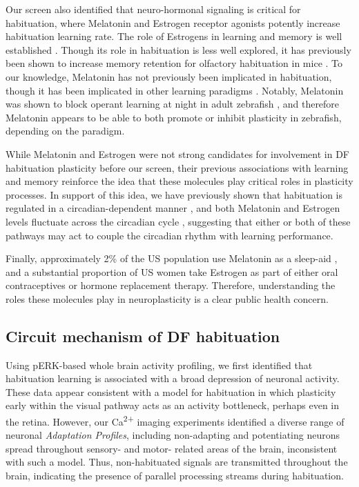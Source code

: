 \documentclass[9pt,lineno]{RandlettLab_elife}
\begin{document}
Our screen also identified that neuro-hormonal signaling is critical for habituation, where Melatonin and Estrogen receptor agonists potently increase habituation learning rate. The role of Estrogens in learning and memory is well established \cite{Luine1998-iz,Nilsson2002-fi}. Though its role in habituation is less well explored, it has previously been shown to increase memory retention for olfactory habituation in mice \cite{Dillon2013-ez}. To our knowledge, Melatonin has not previously been implicated in habituation, though it has been implicated in other learning paradigms \cite{El-Sherif2003-tv, Jilg2019-lq}. Notably, Melatonin was shown to block operant learning at night in adult zebrafish \cite{Rawashdeh2007-ts}, and therefore Melatonin appears to be able to both promote or inhibit plasticity in zebrafish, depending on the paradigm. 

While Melatonin and Estrogen were not strong candidates for involvement in DF habituation plasticity before our screen, their previous associations with learning and memory reinforce the idea that these molecules play critical roles in plasticity processes. In support of this idea, we have previously shown that habituation is regulated in a circadian-dependent manner \cite{Randlett2019-fi}, and both Melatonin and Estrogen levels fluctuate across the circadian cycle \cite{Alvord2022-ii, Gandhi2015-vw, Zhdanova2001-dq}, suggesting that either or both of these pathways may act to couple the circadian rhythm with learning performance. 

Finally, approximately 2\% of the US population use Melatonin as a sleep-aid \cite{Li2022-lu}, and a substantial proportion of US women take Estrogen as part of either oral contraceptives or hormone replacement therapy. Therefore, understanding the roles these molecules play in neuroplasticity is a clear public health concern. 

\subsection{Circuit mechanism of DF habituation}

Using pERK-based whole brain activity profiling, we first identified that habituation learning is associated with a broad depression of neuronal activity. These data appear consistent with a model for habituation in which plasticity early within the visual pathway acts as an activity bottleneck, perhaps even in the retina. However, our Ca\textsuperscript{2+} imaging experiments identified a diverse range of neuronal \emph{Adaptation Profiles}, including non-adapting and potentiating neurons spread throughout sensory- and motor- related areas of the brain, inconsistent with such a model. Thus, non-habituated signals are transmitted throughout the brain, indicating the presence of parallel processing streams during habituation. 
\end{document}
